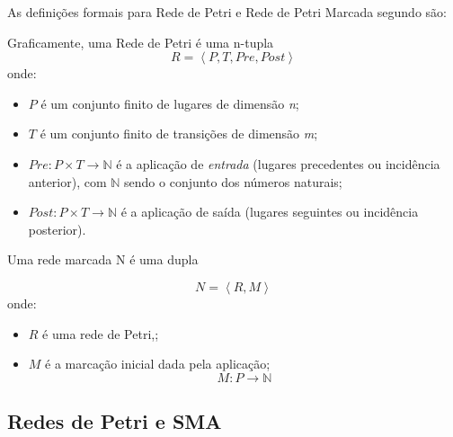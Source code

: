 As definições formais para Rede de Petri e Rede de Petri Marcada segundo \citet{cardoso1997redes} são:

\begin{definition}
\label{drp}
Graficamente, uma Rede de Petri é uma n-tupla
\begin{equation}
R = \left \langle P, T, Pre, Post \right \rangle
\end{equation}
onde:
\begin{itemize}
\item $P$ é um conjunto finito de lugares de dimensão \textit{n};
\item $T$ é um conjunto finito de transições de dimensão \textit{m};
\item $Pre : P \times T \rightarrow \mathbb{N}$   é a aplicação de \textit{entrada} (lugares precedentes ou incidência anterior), com $\mathbb{N}$ sendo o conjunto dos números naturais;
\item $Post : P \times T \rightarrow \mathbb{N}$ é a aplicação de saída (lugares seguintes ou incidência posterior).
\end{itemize}
\end{definition}

\begin{definition}
  \label{drpmarcada}
  Uma rede marcada N é uma dupla

  \begin{equation}
      N = \left \langle R,M \right \rangle
  \end{equation}
  onde:
  \begin{itemize}
  \item $R$ é uma rede de Petri,;
  \item $M$ é a marcação inicial dada pela aplicação;
    \begin{equation}
        M : P \rightarrow \mathbb{N}
    \end{equation}
  \end{itemize}
\end{definition}

\subsection{Redes de Petri e SMA}

